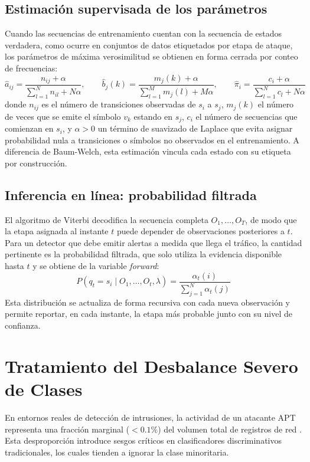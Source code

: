 \subsection{Estimación supervisada de los parámetros}
Cuando las secuencias de entrenamiento cuentan con la secuencia de estados verdadera, como ocurre en conjuntos de datos etiquetados por etapa de ataque, los parámetros de máxima verosimilitud se obtienen en forma cerrada por conteo de frecuencias:
\begin{equation}
\hat{a}_{ij} = \frac{n_{ij} + \alpha}{\sum_{l=1}^{N} n_{il} + N\alpha}, \qquad
\hat{b}_j(k) = \frac{m_j(k) + \alpha}{\sum_{l=1}^{M} m_j(l) + M\alpha}, \qquad
\hat{\pi}_i = \frac{c_i + \alpha}{\sum_{l=1}^{N} c_l + N\alpha}
\end{equation}
donde $n_{ij}$ es el número de transiciones observadas de $s_i$ a $s_j$, $m_j(k)$ el número de veces que se emite el símbolo $v_k$ estando en $s_j$, $c_i$ el número de secuencias que comienzan en $s_i$, y $\alpha > 0$ un término de suavizado de Laplace que evita asignar probabilidad nula a transiciones o símbolos no observados en el entrenamiento. A diferencia de Baum-Welch, esta estimación vincula cada estado con su etiqueta por construcción.

\subsection{Inferencia en línea: probabilidad filtrada}
El algoritmo de Viterbi decodifica la secuencia completa $O_1, \dots, O_T$, de modo que la etapa asignada al instante $t$ puede depender de observaciones posteriores a $t$. Para un detector que debe emitir alertas a medida que llega el tráfico, la cantidad pertinente es la probabilidad filtrada, que solo utiliza la evidencia disponible hasta $t$ y se obtiene de la variable \textit{forward}:
\begin{equation}
P(q_t = s_i \mid O_1, \dots, O_t, \lambda) = \frac{\alpha_t(i)}{\sum_{j=1}^{N} \alpha_t(j)}
\end{equation}
Esta distribución se actualiza de forma recursiva con cada nueva observación y permite reportar, en cada instante, la etapa más probable junto con su nivel de confianza.

\section{Tratamiento del Desbalance Severo de Clases}
En entornos reales de detección de intrusiones, la actividad de un atacante APT representa una fracción marginal ($< 0.1\%$) del volumen total de registros de red \parencite{myneni2020dapt2020}. Esta desproporción introduce sesgos críticos en clasificadores discriminativos tradicionales, los cuales tienden a ignorar la clase minoritaria.

